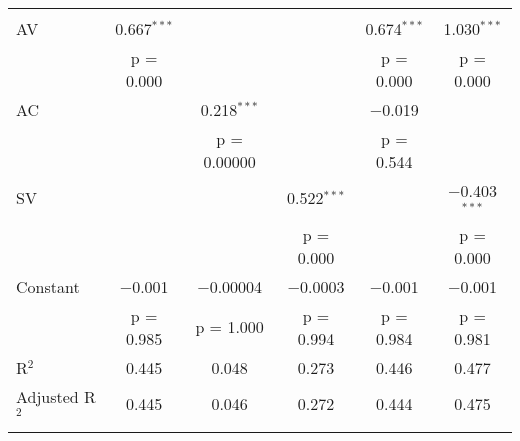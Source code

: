 
\begin{tabular}{@{\extracolsep{5pt}}lccccc} 
\\[-1.8ex]
\hline \\[-1.8ex] 
 AV & 0.667$^{***}$ &  &  & 0.674$^{***}$ & 1.030$^{***}$ \\ 
  & p = 0.000 &  &  & p = 0.000 & p = 0.000 \\ 
 AC &  & 0.218$^{***}$ &  & $-$0.019 &  \\ 
  &  & p = 0.00000 &  & p = 0.544 &  \\ 
 SV &  &  & 0.522$^{***}$ &  & $-$0.403$^{***}$ \\ 
  &  &  & p = 0.000 &  & p = 0.000 \\ 
 Constant & $-$0.001 & $-$0.00004 & $-$0.0003 & $-$0.001 & $-$0.001 \\ 
  & p = 0.985 & p = 1.000 & p = 0.994 & p = 0.984 & p = 0.981 \\ 
R$^{2}$ & 0.445 & 0.048 & 0.273 & 0.446 & 0.477 \\ 
Adjusted R$^{2}$ & 0.445 & 0.046 & 0.272 & 0.444 & 0.475 \\ 
\hline \\[-1.8ex] 
\end{tabular} 
